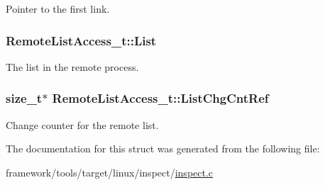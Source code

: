 Pointer to the first link. 

\subsubsection[{\texorpdfstring{List}{List}}]{ Remote\+List\+Access\+\_\+t\+::\+List}\hypertarget{struct_remote_list_access__t_a0beca8c72c6c97e32b1bdd8b6fe2d63c}{}\label{struct_remote_list_access__t_a0beca8c72c6c97e32b1bdd8b6fe2d63c}


The list in the remote process. 

\subsubsection[{\texorpdfstring{List\+Chg\+Cnt\+Ref}{ListChgCntRef}}]{\setlength{\rightskip}{0pt plus 5cm}size\+\_\+t$\ast$ Remote\+List\+Access\+\_\+t\+::\+List\+Chg\+Cnt\+Ref}\hypertarget{struct_remote_list_access__t_aace368b0efa95eee15471dd07bf90006}{}\label{struct_remote_list_access__t_aace368b0efa95eee15471dd07bf90006}


Change counter for the remote list. 



The documentation for this struct was generated from the following file\+:\begin{DoxyCompactItemize}
\item 
framework/tools/target/linux/inspect/\hyperlink{inspect_8c}{inspect.\+c}\end{DoxyCompactItemize}
